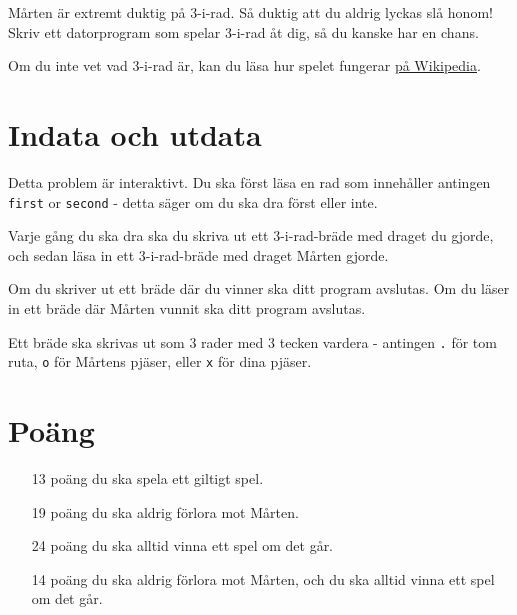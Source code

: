 
Mårten är extremt duktig på 3-i-rad. Så duktig att du aldrig lyckas slå honom! Skriv ett datorprogram som spelar 3-i-rad åt dig, så du kanske har en chans.

Om du inte vet vad 3-i-rad är, kan du läsa hur spelet fungerar \href{https://sv.wikipedia.org/wiki/Tre_i_rad}{på Wikipedia}.

\section*{Indata och utdata}
Detta problem är interaktivt. Du ska först läsa en rad som innehåller antingen \texttt{first} or \texttt{second} - detta säger om du ska dra först eller inte.

Varje gång du ska dra ska du skriva ut ett 3-i-rad-bräde med draget du gjorde, och sedan läsa in ett 3-i-rad-bräde med draget Mårten gjorde.

Om du skriver ut ett bräde där du vinner ska ditt program avslutas. Om du läser in ett bräde där Mårten vunnit ska ditt program avslutas.

Ett bräde ska skrivas ut som 3 rader med 3 tecken vardera - antingen \texttt{.} för tom ruta, \texttt{o} för Mårtens pjäser, eller \texttt{x} för dina pjäser.

\section*{Poäng}

\begin{enumerate}
	\item[13 poäng] du ska spela ett giltigt spel.
	\item[19 poäng] du ska aldrig förlora mot Mårten.
	\item[24 poäng] du ska alltid vinna ett spel om det går.
	\item[14 poäng] du ska aldrig förlora mot Mårten, och du ska alltid vinna ett spel om det går.
\end{enumerate}
